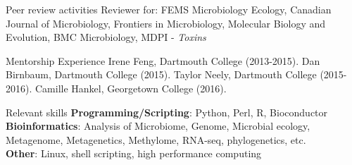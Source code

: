 \documentclass{resume} %
\begin{document}

\begin{rSection}{Peer review activities}
Reviewer for: FEMS Microbiology Ecology, Canadian Journal of Microbiology, Frontiers in Microbiology, Molecular Biology and Evolution, BMC Microbiology, MDPI - \textit{Toxins}
\end{rSection}



\begin{rSection}{Mentorship Experience}
Irene Feng, Dartmouth College (2013-2015).
Dan Birnbaum, Dartmouth College (2015).
Taylor Neely, Dartmouth College (2015-2016).
Camille Hankel, Georgetown College (2016).
\end{rSection}




\begin{rSection}{Relevant skills}
{\bf Programming/Scripting}: Python, Perl, R, Bioconductor\\
{\bf Bioinformatics}: Analysis of Microbiome, Genome, Microbial ecology, Metagenome, Metagenetics, Methylome, RNA-seq, phylogenetics, etc.\\
{\bf Other}: Linux, shell scripting, high performance computing\\
\end{rSection}







\end{document}
